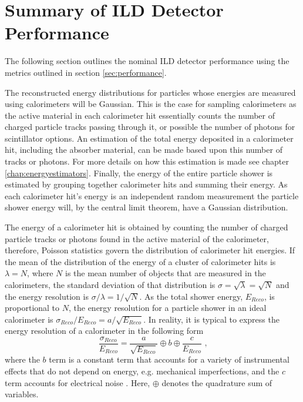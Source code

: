 \section{Summary of ILD Detector Performance}
\label{sec:nominaldetectorperformance}
The following section outlines the nominal ILD detector performance using the metrics outlined in section \ref{sec:performance}.  

The reconstructed energy distributions for particles whose energies are measured using calorimeters will be Gaussian.  This is the case for sampling calorimeters as the active material in each calorimeter hit essentially counts the number of charged particle tracks passing through it, or possible the number of photons for scintillator options.  An estimation of the total energy deposited in a calorimeter hit, including the absorber material, can be made based upon this number of tracks or photons.  For more details on how this estimation is made see chapter \ref{chap:energyestimators}.  Finally, the energy of the entire particle shower is estimated by grouping together calorimeter hits and summing their energy.  As each calorimeter hit's energy is an independent random measurement the particle shower energy will, by the central limit theorem, have a Gaussian distribution.  

The energy of a calorimeter hit is obtained by counting the number of charged particle tracks or photons found in the active material of the calorimeter, therefore, Poisson statistics govern the distribution of calorimeter hit energies.  If the mean of the distribution of the energy of a cluster of calorimeter hits is $\lambda = N$, where $N$ is the mean number of objects that are measured in the calorimeters, the standard deviation of that distribution is $\sigma = \sqrt{\lambda} = \sqrt{N}$ and the energy resolution is $\sigma / \lambda = 1 / \sqrt{N}$.  As the total shower energy, $E_{Reco}$, is proportional to $N$, the energy resolution for a particle shower in an ideal calorimeter is $\sigma_{Reco} / E_{Reco} = a / \sqrt{E_{Reco}}$.  In reality, it is typical to express the energy resolution of a calorimeter in the following form
%
\begin{equation} 
\frac{\sigma_{Reco}}{E_{Reco}} = \frac{a}{\sqrt{E_{Reco}}} \oplus b \oplus \frac{c}{E_{Reco}}\text{ ,}
\end{equation}
%
\noindent where the $b$ term is a constant term that accounts for a variety of instrumental effects that do not depend on energy, e.g. mechanical imperfections, and the $c$ term accounts for electrical noise \cite{Fabjan:2003aq}.  Here, $\oplus$ denotes the quadrature sum of variables.  

